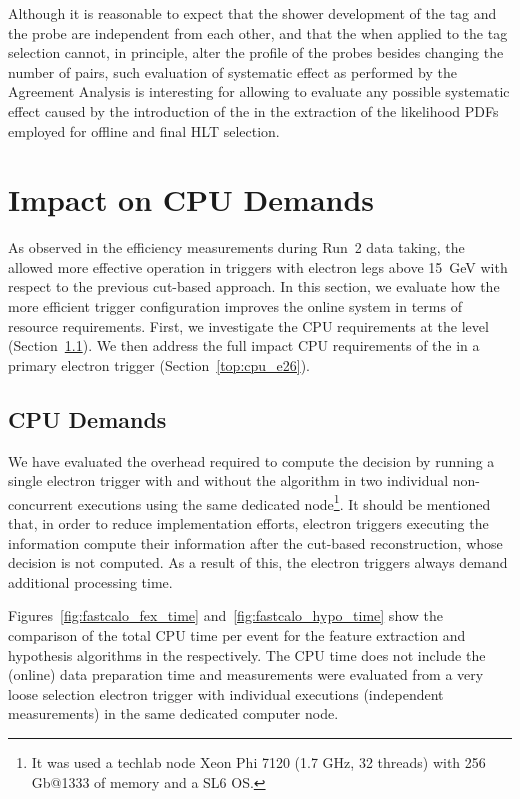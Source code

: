 Although it is reasonable to expect that the shower development of the tag and
the probe are independent from each other, and that the \rnn{} when applied to
the tag selection cannot, in principle, alter the profile of the probes besides
changing the number of \tnp{} pairs, such evaluation of systematic effect as
performed by the Agreement Analysis is interesting for allowing to evaluate any
possible systematic effect caused by the introduction of the \rnn{} in the extraction of the
likelihood PDFs employed for offline and final HLT selection.

\FloatBarrier
\section{Impact on CPU Demands} %

As observed in the efficiency measurements during Run~2 data taking, the \rnn{}
allowed more effective \fastcalo{} operation in triggers with electron legs
above \SI{15}{\GeV}  with respect to the previous cut-based approach. In this section, we evaluate how the more efficient trigger
configuration improves the online system in terms of resource requirements.
First, we investigate the CPU requirements at the \fastcalo{}
level (Section~\ref{top:fastcalo_cpu}). We then address the full impact CPU
requirements of the \rnn{} in a primary electron trigger
(Section~\ref{top:cpu_e26}).

\subsection{\fastcalo{} CPU Demands}\label{top:fastcalo_cpu}


We have evaluated the overhead required to compute the \rnn{} decision by running a single electron trigger with and without the \rnn algorithm in two individual non-concurrent executions using the same dedicated node\footnote{It was used a techlab node Xeon Phi 7120 (1.7 GHz, 32 threads) with 256 Gb@1333 of memory and a SL6 OS.}. It should be mentioned that, in order to reduce implementation efforts, electron triggers executing the \rnn{} information compute their information after the cut-based reconstruction, whose decision is not computed. As a result of this, the \rnn{} electron 
triggers always demand additional \fastcalo processing time.

Figures~\ref{fig:fastcalo_fex_time} and~\ref{fig:fastcalo_hypo_time} show the comparison of the total CPU time per event for the feature extraction and hypothesis algorithms in the \fastcalo respectively.
The CPU time does not include the (online) data preparation time and measurements were evaluated from a very loose selection electron trigger with individual executions (independent measurements) in the same dedicated computer node.


